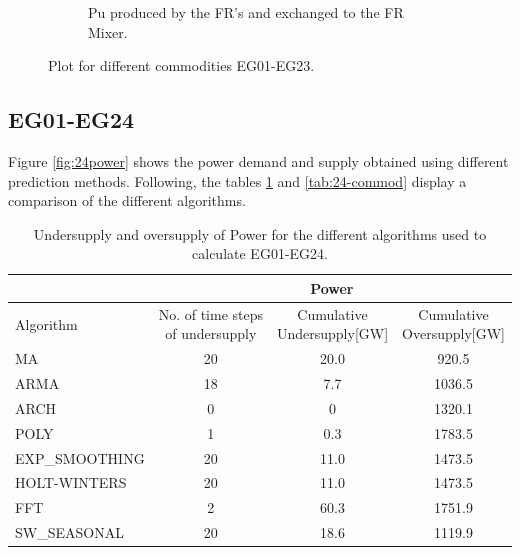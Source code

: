 \documentclass[11pt,letterpaper]{article}
\begin{document}
\begin{figure}[]
\begin{subfigure}[t]{.45\textwidth}
	\caption{Pu produced by the FR's and exchanged to the FR Mixer.}
	\label{fig:23-arch-frpu}
\end{subfigure}
	\hfill
	\caption{Plot for different commodities EG01-EG23.}
	\label{fig:23-arch-commod}
\end{figure}

\subsection{EG01-EG24}

Figure \ref{fig:24power} shows the power demand and supply obtained using different prediction methods. Following, the tables \ref{tab:24-power} and \ref{tab:24-commod} display a comparison of the different algorithms.

\begin{table}[]
	\centering
	\caption {Undersupply and oversupply of Power for the different algorithms used to calculate EG01-EG24.}
	\label{tab:24-power}
	\begin{tabular}{|l|c|c|c|}
		\hline
		& \multicolumn{3}{c|}{Power} \\ \hline
		Algorithm & \shortstack{No. of time steps\\of undersupply}  & 
		\shortstack{Cumulative\\Undersupply[GW]}  & \shortstack{Cumulative\\Oversupply[GW]} \\ \hline
		MA        & 20 	& 20.0  &  920.5   \\ \hline
		ARMA      & 18 	&  7.7  &  1036.5  \\ \hline
		ARCH      &  0 	&   0  	&  1320.1  \\ \hline
		POLY      &  1 	&  0.3 	&  1783.5  \\ \hline
		EXP\_SMOOTHING 	& 20 	& 11.0 & 1473.5 \\ \hline
		HOLT-WINTERS  	& 20 	& 11.0 & 1473.5 \\ \hline
		FFT       & 2 	& 60.3 	& 1751.9	\\ \hline
		SW\_SEASONAL    & 20 	& 18.6 	& 1119.9 	\\ \hline
	\end{tabular}
\end{table}
\end{document}
